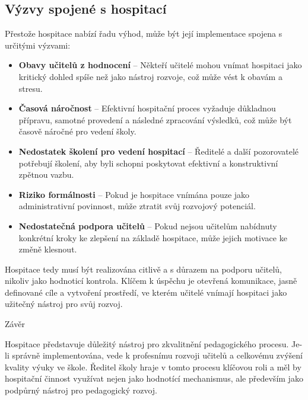\subsection{Výzvy spojené s hospitací}

Přestože hospitace nabízí řadu výhod, může být její implementace spojena s určitými výzvami:

\begin{itemize}
    \item \textbf{Obavy učitelů z hodnocení} – Někteří učitelé mohou vnímat hospitaci jako kritický dohled spíše než jako nástroj rozvoje, což může vést k obavám a stresu.
    \item \textbf{Časová náročnost} – Efektivní hospitační proces vyžaduje důkladnou přípravu, samotné provedení a následné zpracování výsledků, což může být časově náročné pro vedení školy.
    \item \textbf{Nedostatek školení pro vedení hospitací} – Ředitelé a další pozorovatelé potřebují školení, aby byli schopni poskytovat efektivní a konstruktivní zpětnou vazbu.
    \item \textbf{Riziko formálnosti} – Pokud je hospitace vnímána pouze jako administrativní povinnost, může ztratit svůj rozvojový potenciál.
    \item \textbf{Nedostatečná podpora učitelů} – Pokud nejsou učitelům nabídnuty konkrétní kroky ke zlepšení na základě hospitace, může jejich motivace ke změně klesnout.
\end{itemize}

Hospitace tedy musí být realizována citlivě a s důrazem na podporu učitelů, nikoliv jako hodnoticí kontrola. Klíčem k úspěchu je otevřená komunikace, jasně definované cíle a vytvoření prostředí, ve kterém učitelé vnímají hospitaci jako užitečný nástroj pro svůj rozvoj.

Závěr

Hospitace představuje důležitý nástroj pro zkvalitnění pedagogického procesu. Je-li správně implementována, vede k profesnímu rozvoji učitelů a celkovému zvýšení kvality výuky ve škole. Ředitel školy hraje v tomto procesu klíčovou roli a měl by hospitační činnost využívat nejen jako hodnotící mechanismus, ale především jako podpůrný nástroj pro pedagogický rozvoj.